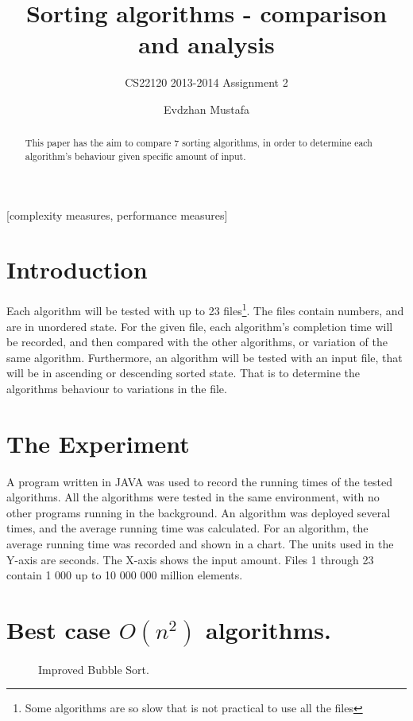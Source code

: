 \documentclass{acm_proc_article-sp}
\begin{document}
\title{Sorting algorithms - comparison and analysis }
\subtitle{ CS22120 2013-2014 Assignment 2 }
\author{
\alignauthor
Evdzhan Mustafa\\
}
\maketitle
\begin{abstract}
This paper has the aim to compare 7 sorting algorithms, in order to determine each algorithm's behaviour given specific amount of input.
\end{abstract}
[complexity measures, performance measures]
\section{Introduction}
Each algorithm will be tested with up to 23 files\footnote{Some algorithms are so slow that is not practical to use all the files}. The files contain numbers, and are in unordered state. For the given file, each algorithm's completion time will be recorded, and then compared with the other algorithms, or variation of the same algorithm. Furthermore, an algorithm will be tested with an input file, that will be in ascending or descending sorted state. That is to determine the algorithms behaviour to variations in the file.
\section{The {\secit Experiment }}
A program written in JAVA was used to record the running times of the tested algorithms. All the algorithms were tested in the same environment, with no other programs running in the background. An algorithm was deployed several times, and the average running time was calculated. For an algorithm, the average running time was recorded and shown in a chart. The units used in the Y-axis are seconds. The X-axis shows the input amount. Files 1 through 23 contain 1 000 up to 10 000 000 million elements.
\section{Best case $O(n^2)$ algorithms.}
\begin{figure}[!htb]
\centering
\caption{Improved Bubble Sort.}
\end{figure}
\end{document}
